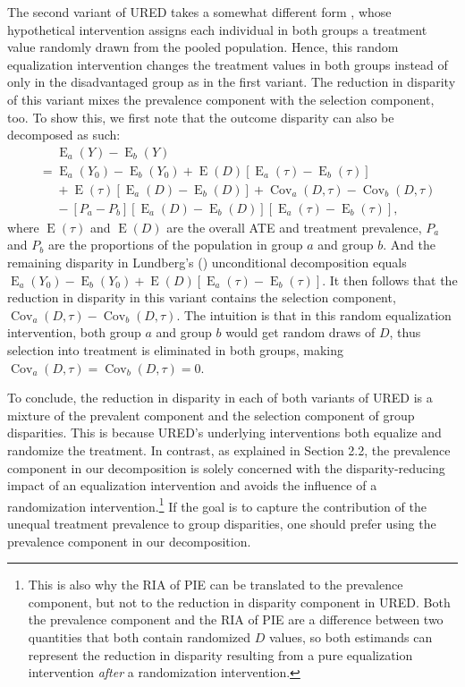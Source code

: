 \documentclass[12pt,a4paper]{article}
\newcommand{\Cov}{\operatorname{Cov}}
\newcommand{\E}{\operatorname{E}}
\begin{document}
The second variant of URED takes a somewhat different form \citep{lundberg_gap-closing_2022}, whose hypothetical intervention assigns each individual in both groups a treatment value randomly drawn from the pooled population. Hence, this random equalization intervention changes the treatment values in both groups instead of only in the disadvantaged group as in the first variant. The reduction in disparity of this variant  mixes the prevalence component with the selection component, too. To show this, we first note that the outcome disparity can also be decomposed as such: 
\begin{align*}
&\phantom{{}={}} \E_a(Y)-\E_b(Y) \\
&= \E_a(Y_{0})-\E_b(Y_{0}) +  \E(D)[ \E_a(\tau) - \E_b(\tau)]  \\
&\phantom{{}={}} +\E(\tau)[\E_a(D)-\E_b(D)] + \Cov_a(D, \tau) - \Cov_b(D, \tau) \\
&\phantom{{}={}} - [P_a-P_b][\E_a(D) - \E_b(D)][\E_a(\tau)-\E_b(\tau)], 
\end{align*} 
where $\E(\tau)$ and $\E(D)$ are the overall ATE and treatment prevalence, $P_a$ and $P_b$ are the proportions of the population in group $a$ and group $b$.
And the remaining disparity in Lundberg's (\citeyear{lundberg_gap-closing_2022}) unconditional decomposition equals 
$\E_a(Y_{0})-\E_b(Y_{0}) + \E(D)[ \E_a(\tau) - \E_b(\tau)] \nonumber$. It then follows that the reduction in disparity in this variant contains the selection component, $\Cov_a(D, \tau) -  \Cov_b(D, \tau)$. The intuition is that in this random equalization intervention, both group $a$ and group $b$ would get random draws of $D$, thus  selection into treatment is eliminated in both groups, making $\Cov_a(D,\tau)=\Cov_b(D,\tau)=0$.

To conclude, the reduction in disparity in each of both variants of URED is a mixture of the prevalent component and the selection component of group disparities. This is because URED's underlying interventions both equalize and randomize the treatment. In contrast, as explained in Section 2.2,  the prevalence component in our decomposition is solely concerned with the disparity-reducing impact of an equalization intervention and avoids the influence of a randomization intervention.\footnote{This is also why the RIA of PIE can be translated to the prevalence component, but not to the reduction in disparity component in URED. Both the prevalence component and the RIA of PIE are a difference between two quantities that both contain randomized $D$ values, so both estimands can represent the reduction in disparity resulting from a pure equalization intervention \emph{after} a randomization intervention.} If the goal is to capture the contribution of the unequal treatment prevalence to group disparities, one should prefer using the prevalence component in our decomposition.
 
\end{document}
